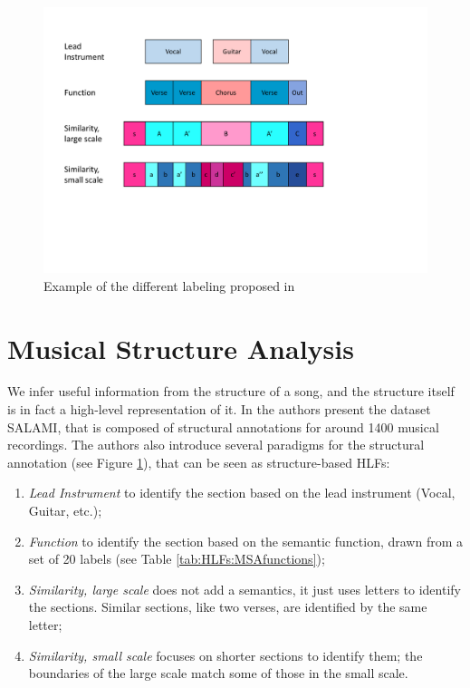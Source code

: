 \begin{figure}[tbp]
	\begin{center}
		\includegraphics[trim=1cm 6cm 6cm 2cm,clip=true,width=\textwidth]{img/HLFs/functionColors}
	\end{center}
	\caption{Example of the different labeling proposed in \cite{Smith2011}}
	\label{fig:HLFs:MSAscales}
	
\end{figure}

\section{Musical Structure Analysis}\label{sec:HLFs:MSA}
We infer useful information from the structure of a song, and the structure itself is in fact a high-level representation of it. In \cite{Smith2011} the authors present the dataset SALAMI, that is composed of structural annotations for around 1400 musical recordings. The authors also introduce several paradigms for the structural annotation (see Figure \ref{fig:HLFs:MSAscales}), that can be seen as structure-based HLFs:
\begin{enumerate}
	\item \textit{Lead Instrument} to identify the section based on the lead instrument (Vocal, Guitar, etc.);
	\item \textit{Function} to identify the section based on the semantic function, drawn from a set of 20 labels (see Table \ref{tab:HLFs:MSAfunctions});
	\item \textit{Similarity, large scale} does not add a semantics, it just uses letters to identify the sections. Similar sections, like two verses, are identified by the same letter;
	\item \textit{Similarity, small scale} focuses on shorter sections to identify them; the boundaries of the large scale match some of those in the small scale.
\end{enumerate}

